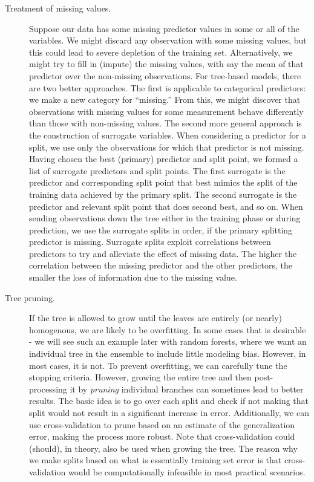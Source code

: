 \begin{refsection}
\begin{description}
\item[Treatment of missing values.] Suppose our data has some missing predictor values in some or all of the variables. We might discard any observation with some missing values, but this could lead to severe depletion of the training set. Alternatively, we might try to fill in (impute) the missing values, with say the mean of that predictor over the non-missing observations. For tree-based models, there are two better approaches. The first is applicable to categorical predictors: we make a new category for “missing.” From this, we might discover that observations with missing values for some measurement behave differently than those with non-missing values. The second more general approach is the construction of surrogate variables. When considering a predictor for a split, we use only the observations for which that predictor is not missing. Having chosen the best (primary) predictor and split point, we formed a list of surrogate predictors and split points. The first surrogate is the predictor and corresponding split point that best mimics the split of the training data achieved by the primary split. The second surrogate is the predictor and relevant split point that does second best, and so on. When sending observations down the tree either in the training phase or during prediction, we use the surrogate splits in order, if the primary splitting predictor is missing. Surrogate splits exploit correlations between predictors to try and alleviate the effect of missing data. The higher the correlation between the missing predictor and the other predictors, the smaller the loss of information due to the missing value.

\item[Tree pruning.] If the tree is allowed to grow until the leaves are entirely (or nearly) homogenous, we are likely to be overfitting. In some cases that is desirable - we will see such an example later with random forests, where we want an individual tree in the ensemble to include little modeling bias. However, in most cases, it is not. To prevent overfitting, we can carefully tune the stopping criteria. However, growing the entire tree and then post-processing it by {\em pruning} individual branches can sometimes lead to better results. The basic idea is to go over each split and check if not making that split would not result in a significant increase in error.
Additionally, we can use cross-validation to prune based on an estimate of the generalization error, making the process more robust. Note that cross-validation could (should), in theory, also be used when growing the tree. The reason why we make splits based on what is essentially training set error is that cross-validation would be computationally infeasible in most practical scenarios.


\end{description}
\end{refsection}
